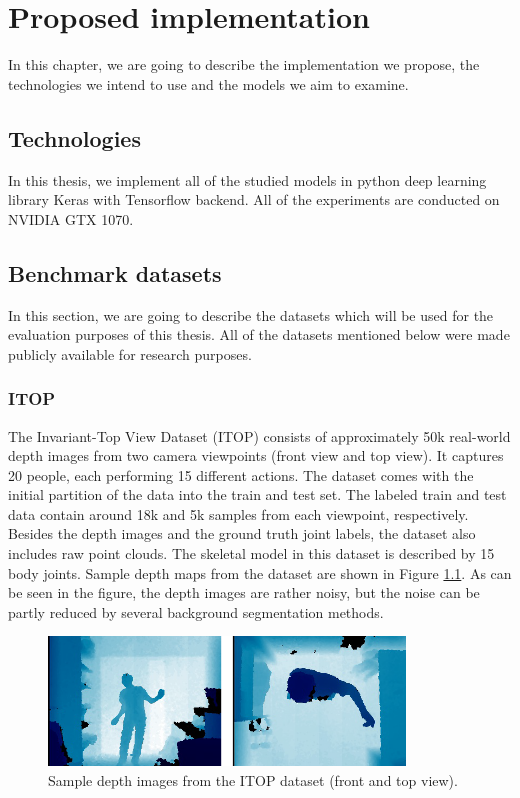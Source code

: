 \chapter{Proposed implementation}\label{chap:proposal}
In this chapter, we are going to describe the implementation we propose, the technologies we intend to use and the models we aim to examine.


\section{Technologies}
In this thesis, we implement all of the studied models in python deep learning library Keras with Tensorflow backend. All of the experiments are conducted on NVIDIA GTX 1070.

\section{Benchmark datasets}

In this section, we are going to describe the datasets which will be used for the evaluation purposes of this thesis. All of the datasets mentioned below were made publicly available for research purposes.
\subsection{ITOP}
The Invariant-Top View Dataset (ITOP) \cite{haque2016viewpoint} consists of approximately 50k real-world depth images from two camera viewpoints (front view and top view). It captures 20 people, each performing 15 different actions. The dataset comes with the initial partition of the data into the train and test set. The labeled train and test data contain around 18k and 5k samples from each viewpoint, respectively. Besides the depth images and the ground truth joint labels, the dataset also includes raw point clouds. The skeletal model in this dataset is described by 15 body joints. Sample depth maps from the dataset are shown in Figure \ref{fig:itop}. As can be seen in the figure, the depth images are rather noisy, but the noise can be partly reduced by several background segmentation methods.\par

\vspace{5mm}
\begin{figure}[H]
\begin{center}
  \includegraphics[height=130px]{images/implementation/itop.png}
  \caption[Sample depth images from the ITOP dataset \cite{haque2016viewpoint}.]{Sample depth images from the ITOP dataset \cite{haque2016viewpoint} (front and top view).}
  \label{fig:itop}
\end{center}
\end{figure}

